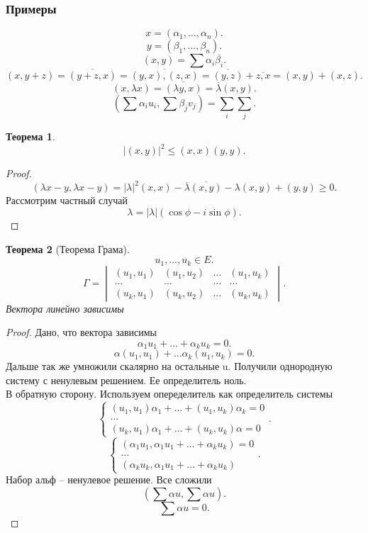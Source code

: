 \documentclass{scrartcl}
\newtheorem{theorem}{Теорема}
\begin{document}
\subsubsection{Примеры}
\[
	x = (\alpha_1,\dots,\alpha_{n})
	.\]
\[
	y = (\beta_1,\dots,\beta_{n})
	.\]
\[
	(x,y) = \sum \alpha_{i} \overline{\beta_{i}}
	.\]
\[
	(x,y + z) = \overline{(y + z,x)} = \overline{(y,x),(z,x)} = \overline{(y,z)} + \overline{z,x}=  (x,y) + (x,z)
	.\]
\[
	(x,\lambda x) = \overline{(\lambda y,x)} = \overline{\lambda} (x,y)
	.\]
\[
	(\sum \alpha_{i} u_{i},\sum \beta_{j} v_{j}) = \sum_{i}\sum_{j}
	.\]
\begin{theorem}
	\[
		|(x,y)|^2 \le  (x,x)(y,y)
		.\]
\end{theorem}
\begin{proof}
	\[
		(\lambda x - y , \lambda x - y) =
		|\lambda|^2(x,x) - \overline{\lambda} \overline{(x,y)} - \lambda(x,y) + (y,y) \ge  0
		.\]
	Рассмотрим частный случай
	\[
		\lambda = |\lambda| (\cos{\phi} - i \sin{\phi})
		.\]
\end{proof}
\begin{theorem}[Теорема Грама]
	\[
		u_1,\dots,u_{k} \in E
		.\]
	\[
		\Gamma =
		\begin{vmatrix}
			(u_1,u_1)   & (u_1,u_2)   & \dots & (u_1,u_{k})   \\
			\dots       & \dots       & \dots & \dots         \\
			(u_{k},u_1) & (u_{k},u_2) & \dots & (u_{k},u_{k})
		\end{vmatrix}
		.\]
	Вектора линейно зависимы
\end{theorem}
\begin{proof}
	Дано, что вектора зависимы
	\[
		\alpha_{1}u_1 + \dots + \alpha_{k} u_{k} = 0
		.\]
	\[
		\alpha (u_1,u_1) + \dots \alpha_{k} (u_1,u_{k}) = 0
		.\]
	Дальше так же умножили скалярно на остальные u. Получили однородную систему с ненулевым решением. Ее определитель ноль.\\
	В обратную сторону.
	Используем опеределитель как определитель системы
	\[
		\begin{cases}
			(u_1,u_1) \alpha_1 + \dots + (u_1,u_{k}) \alpha_{k} = 0 \\
			\dots                                                   \\
			(u_{k},u_1)\alpha_1 + \dots + (u_{k},u_{k}) \alpha = 0
		\end{cases}
		.\]
	\[
		\begin{cases}
			(\alpha_1 u_1,\alpha_1 u_1 + \dots + \alpha_{k} u_{k}) = 0 \\
			\dots                                                      \\
			(\alpha_{k} u_{k},\alpha_1 u_1 + \dots +  \alpha_{k} u_{k})
		\end{cases}
		.\]
	Набор альф -- ненулевое решение.
	Все сложили
	\[
		(\sum \alpha u, \sum \alpha u)
		.\]
	\[
		\sum \alpha u = 0
		.\]
\end{proof}
\end{document}
